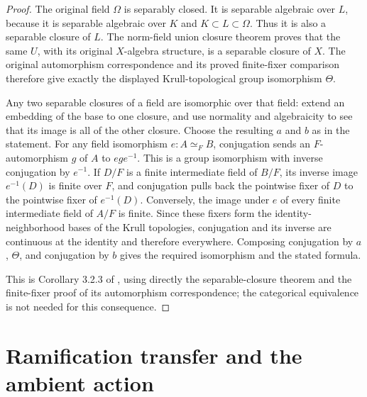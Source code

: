 \begin{proof}
The original field $\Omega$ is separably closed. It is separable
algebraic over $L$, because it is separable algebraic over $K$ and
$K\subset L\subset\Omega$. Thus it is also a separable closure
of $L$. The norm-field union closure theorem proves that the same
$U$, with its original $X$-algebra structure, is a separable closure
of $X$. The original automorphism correspondence and its proved
finite-fixer comparison therefore give exactly the displayed
Krull-topological group isomorphism $\Theta$.

Any two separable closures of a field are isomorphic over that
field: extend an embedding of the base to one closure, and use
normality and algebraicity to see that its image is all of the
other closure. Choose the resulting $a$ and $b$ as in the statement.
For any field isomorphism $e:A\simeq_F B$, conjugation sends an
$F$-automorphism $g$ of $A$ to $ege^{-1}$. This is a group
isomorphism with inverse conjugation by $e^{-1}$. If $D/F$ is a
finite intermediate field of $B/F$, its inverse image $e^{-1}(D)$
is finite over $F$, and conjugation pulls back the pointwise fixer
of $D$ to the pointwise fixer of $e^{-1}(D)$. Conversely, the image
under $e$ of every finite intermediate field of $A/F$ is finite.
Since these fixers form the identity-neighborhood bases of the
Krull topologies, conjugation and its inverse are continuous at
the identity and therefore everywhere. Composing conjugation by
$a$, $\Theta$, and conjugation by $b$ gives the required
isomorphism and the stated formula.

This is Corollary 3.2.3 of \cite{Wintenberger1983}, using directly
the separable-closure theorem and the finite-fixer proof of its
automorphism correspondence; the categorical equivalence is not
needed for this consequence.
\end{proof}

\section{Ramification transfer and the ambient action}

